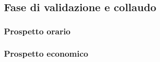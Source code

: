 \subsection{Fase di validazione e collaudo}
\subsubsection{Prospetto orario}
\subsubsection{Prospetto economico}

